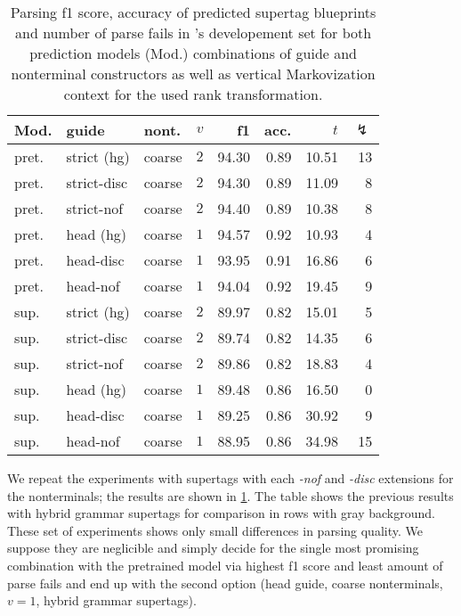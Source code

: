 \documentclass[../../document.tex]{subfiles}
\begin{document}
    \begin{table}
        \caption{\label{tbl:experiments:dptb:dcp}
        Parsing f1 score, accuracy of predicted  supertag blueprints and number of parse fails in 's developement set for both prediction models (Mod.) combinations of guide and nonterminal constructors as well as vertical Markovization context for the used rank transformation.
        }
        \centering
        \setlength{\tabcolsep}{4pt}
        \vspace{.2cm}
        \begin{tabular}{lllc|rrrr}
            \toprule
Mod. &  guide &   nont.   &\(v\)   & f1 & acc. & $t$ & $\lightning$ \\ \hline \rowcolor{black!10}
pret. & strict (hg) &  coarse & \(2\)  & 94.30 & 0.89 & 10.51 & 13  \\\hline
pret. & strict-disc    &  coarse & \(2\)  & 94.30 & 0.89 & 11.09 & 8  \\
pret. & strict-nof     &  coarse & \(2\)  & 94.40 & 0.89 & 10.38 & 8  \\ \hline\rowcolor{black!10}
pret. & head  (hg)  &  coarse & \(1\)  & 94.57 & 0.92 & 10.93 & 4  \\\hline
pret. & head-disc      &  coarse & \(1\)  & 93.95 & 0.91 & 16.86 & 6  \\
pret. & head-nof       &  coarse & \(1\)  & 94.04 & 0.92 & 19.45 & 9  \\
\midrule \rowcolor{black!10}
sup. & strict (hg) &  coarse & \(2\)  & 89.97 & 0.82 & 15.01 & 5  \\\hline
sup. & strict-disc    &  coarse & \(2\)  & 89.74 & 0.82 & 14.35 & 6  \\
sup. & strict-nof     &  coarse & \(2\)  & 89.86 & 0.82 & 18.83 & 4  \\\hline\rowcolor{black!10}
sup. & head (hg)  &  coarse & \(1\)  & 89.48 & 0.86 & 16.50 & 0  \\\hline
sup. & head-disc      &  coarse & \(1\)  & 89.25 & 0.86 & 30.92 & 9  \\
sup. & head-nof       &  coarse & \(1\)  & 88.95 & 0.86 & 34.98 & 15  \\
    \bottomrule
        \end{tabular}
    \end{table}

    We repeat the experiments with  supertags with each \emph{-nof} and \emph{-disc} extensions for the nonterminals; the results are shown in \cref{tbl:experiments:dptb:dcp}.
    The table shows the previous results with hybrid grammar supertags for comparison in rows with gray background.
    These set of experiments shows only small differences in parsing quality.
    We suppose they are neglicible and simply decide for the single most promising combination with the pretrained model via highest f1 score and least amount of parse fails and end up with the second option (head guide, coarse nonterminals, $v=1$, hybrid grammar supertags).
\end{document}
